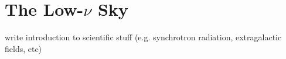 \section{The Low-$\nu$ Sky}
\pg
write introduction to scientific stuff (e.g. synchrotron radiation, extragalactic fields, etc)